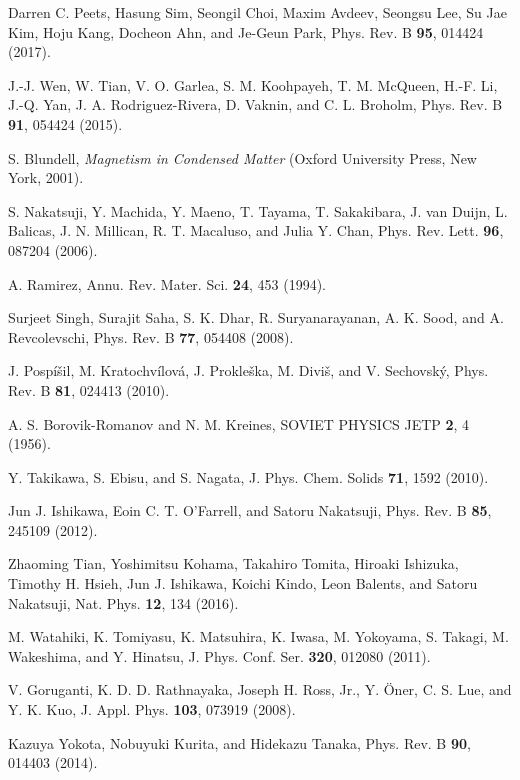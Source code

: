 \documentclass[aps,prl,reprint,amsmath,amssymb,superscriptaddress,showpacs]{revtex4-1}
\begin{document}
\begin{thebibliography}{99}
 Darren C. Peets, Hasung Sim, Seongil Choi, Maxim Avdeev, Seongsu Lee, Su Jae Kim, Hoju Kang, Docheon Ahn, and Je-Geun Park, Phys. Rev. B \textbf{95}, 014424 (2017).

 J.-J. Wen, W. Tian, V. O. Garlea, S. M. Koohpayeh, T. M. McQueen, H.-F. Li, J.-Q. Yan, J. A. Rodriguez-Rivera, D. Vaknin, and C. L. Broholm, Phys. Rev. B \textbf{91}, 054424 (2015).

 S. Blundell, \textit{Magnetism in Condensed Matter} (Oxford University Press, New York, 2001).

 S. Nakatsuji, Y. Machida, Y. Maeno, T. Tayama, T. Sakakibara, J. van Duijn, L. Balicas, J. N. Millican, R. T. Macaluso, and Julia Y. Chan, Phys. Rev. Lett. \textbf{96}, 087204 (2006).

 A. Ramirez, Annu. Rev. Mater. Sci. \textbf{24}, 453 (1994).

 Surjeet Singh, Surajit Saha, S. K. Dhar, R. Suryanarayanan, A. K. Sood, and A. Revcolevschi, Phys. Rev. B \textbf{77}, 054408 (2008).

 J. Posp\'i\v sil, M. Kratochv\'ilov\'a, J. Prokle\v ska, M. Divi\v s, and V. Sechovsk\'y, Phys. Rev. B \textbf{81}, 024413 (2010).

 A. S. Borovik-Romanov and N. M. Kreines, SOVIET PHYSICS JETP \textbf{2}, 4 (1956).

 Y. Takikawa, S. Ebisu, and S. Nagata, J. Phys. Chem. Solids \textbf{71}, 1592 (2010).

 Jun J. Ishikawa, Eoin C. T. O'Farrell, and Satoru Nakatsuji, Phys. Rev. B \textbf{85}, 245109 (2012).

 Zhaoming Tian, Yoshimitsu Kohama, Takahiro Tomita, Hiroaki Ishizuka, Timothy H. Hsieh, Jun J. Ishikawa,	Koichi Kindo, Leon Balents, and Satoru Nakatsuji, Nat. Phys. \textbf{12}, 134 (2016).

 M. Watahiki, K. Tomiyasu, K. Matsuhira, K. Iwasa, M. Yokoyama, S. Takagi, M. Wakeshima, and Y. Hinatsu, J. Phys. Conf. Ser. \textbf{320}, 012080 (2011).

 V. Goruganti, K. D. D. Rathnayaka, Joseph H. Ross, Jr., Y. \"Oner, C. S. Lue, and Y. K. Kuo, J. Appl. Phys. \textbf{103}, 073919 (2008).

 Kazuya Yokota, Nobuyuki Kurita, and Hidekazu Tanaka, Phys. Rev. B \textbf{90}, 014403 (2014).


\end{thebibliography}
\end{document}
